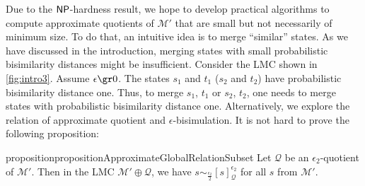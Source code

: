 \documentclass[a4paper,UKenglish,cleveref,autoref,thm-restate]{lipics-v2021}
\newcommand{\Hyp}{\mathcal{M}'}%
\newcommand{\errorParam}{\epsilon_2}%
\newcommand{\Q}{\mathcal{Q}}
\begin{document}
Due to the $\sf NP$-hardness result, we hope to develop practical algorithms to compute approximate quotients of $\Hyp$ that are small but not necessarily of minimum size. To do that, an intuitive idea is to merge ``similar'' states. As we have discussed in the introduction, merging states with small probabilistic bisimilarity distances might be insufficient. Consider the LMC shown in \cref{fig:intro3}. Assume $\epsilon \gr 0$. The states $s_1$ and $t_1$ ($s_2$ and $t_2$) have probabilistic bisimilarity distance one. Thus, to merge $s_1$, $t_1$ or $s_2$, $t_2$, one needs to merge states with probabilistic bisimilarity distance one. Alternatively, we explore the relation of approximate quotient and $\epsilon$-bisimulation. It is not hard to prove the following proposition:%


\begin{restatable}{proposition}{propositionApproximateGlobalRelationSubset}\label{proposition:approximate-quotient-implies-approximate-bisimulation}
	Let $\Q$ be an $\errorParam$-quotient of $\Hyp$. Then in the LMC $\Hyp \oplus \Q$, we have $s \sim_{\frac{\errorParam}{2}} [s]^{\errorParam}_{\Q}$ for all $s$ from $\Hyp$.
\end{restatable}
\end{document}
